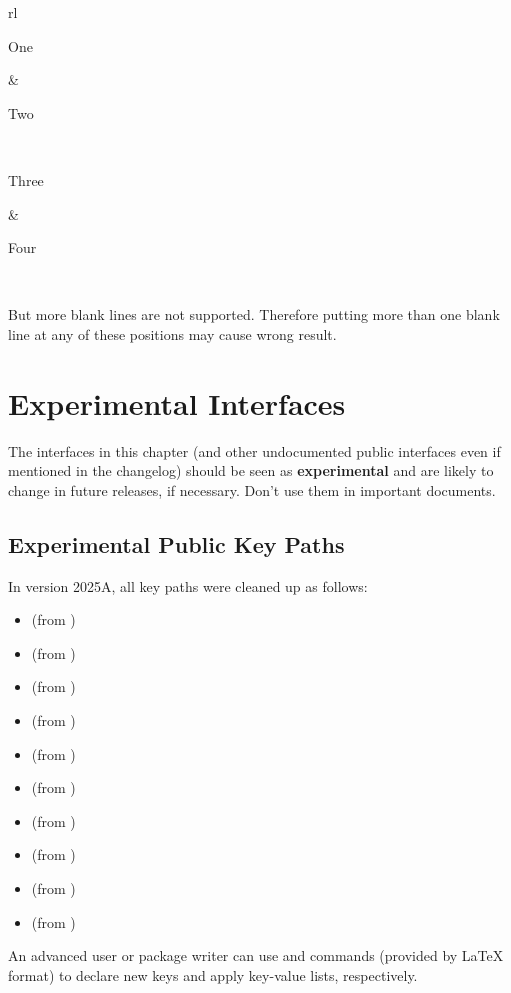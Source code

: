 \documentclass[oneside]{book}
\newcommand{\mywarning}[1]{%
  \begin{tcolorbox}
  #1
  \end{tcolorbox}%
}
\begin{document}
{\begin{demohigh}
\begin{tblr}{rl}
\hline

  One

  &

  Two

  \\

\hline

  Three

  &

  Four

  \\

\hline

\end{tblr}
\end{demohigh}

But more blank lines are not supported.
Therefore putting more than one blank line at any of these positions may cause wrong result.


\chapter{Experimental Interfaces}
\label{chap:exp}

\mywarning{The interfaces in this chapter
(and other undocumented public interfaces even if mentioned in the changelog) should be seen as \textcolor{red3}{\bfseries experimental}
and are likely to change in future releases, if necessary. Don’t use them in important documents.}

\section{Experimental Public Key Paths}

In version 2025A, all  key paths were cleaned up as follows:
\begin{itemize}[nosep]
  \item {} (from )
  \item {} (from )
  \item {} (from )
  \item {} (from )
  \item {} (from )
  \item {} (from )
  \item {} (from )
  \item {} (from )
  \item {} (from )
  \item {} (from )
\end{itemize}
An advanced user or package writer can use \CC{\DeclareKeys} and \CC{\SetKeys} commands
(provided by LaTeX format) to declare new keys and apply key-value lists, respectively.

}
\end{document}
